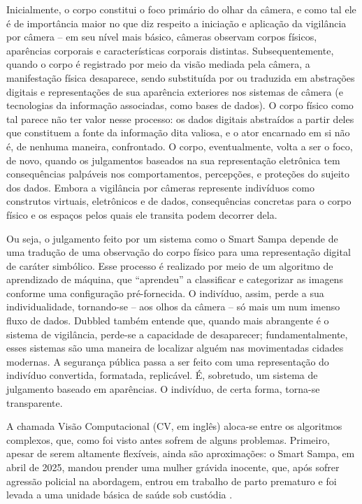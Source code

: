 \begin{citacao}
Inicialmente, o corpo constitui o foco primário do olhar da câmera, e como tal ele é de importância maior no que diz respeito a iniciação e aplicação da vigilância por câmera -- em seu nível mais básico, câmeras observam corpos físicos, aparências corporais e características corporais distintas.
Subsequentemente, quando o corpo é registrado por meio da visão mediada pela câmera, a manifestação física desaparece, sendo substituída por ou traduzida em abstrações digitais e representações de sua aparência exteriores nos sistemas de câmera (e tecnologias da informação associadas, como bases de dados).
O corpo físico como tal parece não ter valor nesse processo: os dados digitais abstraídos a partir deles que constituem a fonte da informação dita valiosa, e o ator encarnado em si não é, de nenhuma maneira, confrontado.
O corpo, eventualmente, volta a ser o foco, de novo, quando os julgamentos baseados na sua representação eletrônica tem consequências palpáveis nos comportamentos, percepções, e proteções do sujeito dos dados.
Embora a vigilância por câmeras represente indivíduos como construtos virtuais, eletrônicos e de dados, consequências concretas para o corpo físico e os espaços pelos quais ele transita podem decorrer dela.\end{citacao}

Ou seja, o julgamento feito por um sistema como o Smart Sampa depende de uma tradução de uma observação do corpo físico para uma representação digital de caráter simbólico.
Esse processo é realizado por meio de um algoritmo de aprendizado de máquina, que ``aprendeu'' a classificar e categorizar as imagens conforme uma configuração pré-fornecida.
O indivíduo, assim, perde a sua individualidade, tornando-se -- aos olhos da câmera -- só mais um num imenso fluxo de dados.
Dubbled também entende que, quando mais abrangente é o sistema de vigilância, perde-se a capacidade de desaparecer; fundamentalmente, esses sistemas são uma maneira de localizar alguém nas movimentadas cidades modernas.
A segurança pública passa a ser feito com uma representação do indivíduo convertida, formatada, replicável.
É, sobretudo, um sistema de julgamento baseado em aparências.
O indivíduo, de certa forma, torna-se transparente.

A chamada Visão Computacional (CV, em inglês) aloca-se entre os algoritmos complexos, que, como foi visto antes sofrem de alguns problemas.
Primeiro, apesar de serem altamente flexíveis, ainda são aproximações: o Smart Sampa, em abril de 2025, mandou prender uma mulher grávida inocente, que, após sofrer agressão policial na abordagem, entrou em trabalho de parto prematuro e foi levada a uma unidade básica de saúde sob custódia \cite{audi_smart_2025}.

